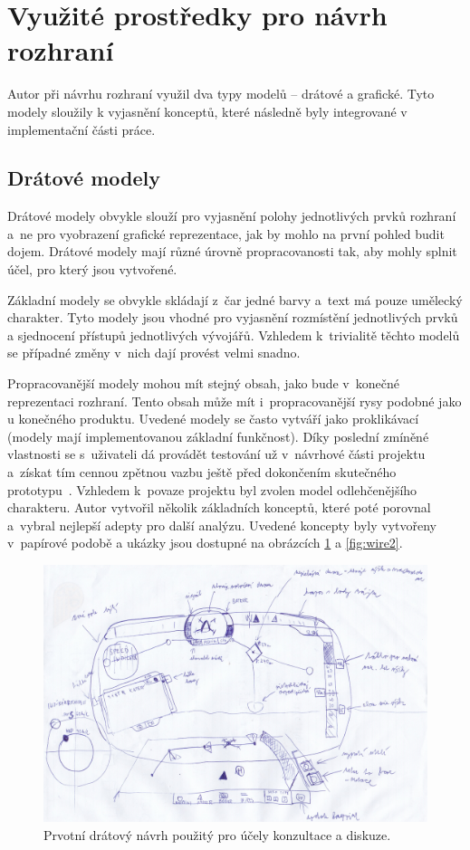 \section{Využité prostředky pro návrh rozhraní}
Autor při návrhu rozhraní využil dva typy modelů -- drátové a grafické. Tyto modely sloužily k vyjasnění konceptů, které následně byly integrované v implementační části práce.
\subsection{Drátové modely} %
Drátové modely obvykle slouží pro vyjasnění polohy jednotlivých prvků rozhraní a~ne  pro vyobrazení grafické reprezentace, jak by mohlo na první pohled budit dojem. Drátové modely mají různé úrovně propracovanosti tak, aby mohly splnit účel, pro který jsou vytvořené.

Základní modely se obvykle skládají z~čar jedné barvy a~text má pouze umělecký charakter. Tyto modely jsou vhodné pro vyjasnění rozmístění jednotlivých prvků a sjednocení přístupů jednotlivých vývojářů. Vzhledem k~trivialitě těchto modelů se případné změny v~nich dají provést velmi snadno.

Propracovanější modely mohou mít stejný obsah, jako bude v~konečné reprezentaci rozhraní. Tento obsah může mít i~propracovanější rysy podobné jako u konečného produktu. Uvedené modely se často vytváří jako proklikávací (modely mají implementovanou základní funkčnost). Díky poslední zmíněné vlastnosti se s~uživateli dá provádět testování už v~návrhové části projektu a~získat tím cennou zpětnou vazbu ještě před dokončením skutečného prototypu~\cite{Wireframing,KomárekJakub2022Nzps}. Vzhledem k~povaze projektu byl zvolen model odlehčenějšího charakteru. Autor vytvořil několik základních konceptů, které poté porovnal a~vybral nejlepší adepty pro další analýzu. Uvedené koncepty byly vytvořeny v~papírové podobě a ukázky jsou dostupné na obrázcích \ref{fig:wire1} a \ref{fig:wire2}. 


\begin{figure}[H]
    \centering
    \includegraphics[width=\linewidth]{obrazky-figures/navrh/allWired.png}
    \caption{Prvotní drátový návrh použitý pro účely konzultace a diskuze. }
    \label{fig:wire1}
\end{figure}

